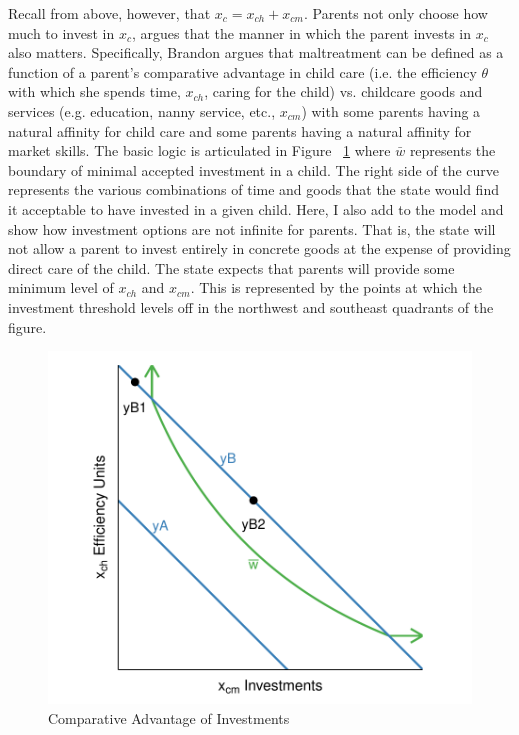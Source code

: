\documentclass[1p, review]{elsarticle}\usepackage[]{graphicx}\usepackage[]{color}
\makeatletter
\def\maxwidth{ %
  \ifdim\Gin@nat@width>\linewidth
    \linewidth
  \else
    \Gin@nat@width
  \fi
}
\newenvironment{knitrout}{}{} %
\makeatother
\begin{document}
Recall from above, however, that $x_c=x_{ch}+x_{cm}$. Parents not only choose how much to invest in $x_c$, \citet{Brandon2001} argues that the manner in which the parent invests in $x_c$ also matters. Specifically, Brandon argues that maltreatment can be defined as a function of a parent's comparative advantage in child care (i.e. the efficiency $\theta$ with which she spends time, $x_{ch}$, caring for the child) vs. childcare goods and services (e.g. education, nanny service, etc., $x_{cm}$) with some parents having a natural affinity for child care and some parents having a natural affinity for market skills. The basic logic is articulated in Figure ~\ref{fig:plot3} where $\bar{w}$ represents the boundary of minimal accepted investment in a child. The right side of the curve represents the various combinations of time and goods that the state would find it acceptable to have invested in a given child. Here, I also add to the \citet{Brandon2001} model and show how investment options are not infinite for parents. That is, the state will not allow a parent to invest entirely in concrete goods at the expense of providing direct care of the child. The state expects that parents will provide some minimum level of $x_{ch}$ and $x_{cm}$. This is represented by the points at which the investment threshold levels off in the northwest and southeast quadrants of the figure. 

\begin{figure}
\begin{knitrout}\small
{}\color{fgcolor}

{\centering \includegraphics[width=\maxwidth]{figure/Figure4} 

}



\end{knitrout}
\caption{Comparative Advantage of Investments}\label{fig:plot3}
\end{figure}
\end{document}
